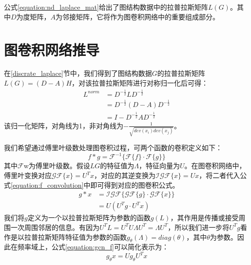 公式\ref{equation:nd_laplace_mat}给出了图结构数据中的拉普拉斯矩阵$L(G)$。其中$D$为度矩阵，$A$为邻接矩阵，它将作为图卷积网络中的重要组成部分。

\section{图卷积网络推导}
在\ref{discrate_laplace}节中，我们得到了图结构数据$G$的拉普拉斯矩阵$L(G) = (D-A)H$，对该拉普拉斯矩阵进行对称归一化后可得：
\begin{equation}
    \begin{aligned}
        L^{norm} &= D^{-\frac{1}{2}}L D^{-\frac{1}{2}} \\
        &= D^{-\frac{1}{2}}(D-A)D^{-\frac{1}{2}} \\
        &= I - D^{-\frac{1}{2}}A D^{-\frac{1}{2}}
    \end{aligned}
    \label{equation:norm_laplace}
\end{equation}
该归一化矩阵，对角线为1，非对角线为$-\frac{1}{\sqrt{dev(x_i)dev(x_j)} }$。

我们希望通过傅里叶级数处理图卷积过程，可两个函数的卷积定义如下：
\begin{equation}
    f*g = \mathcal{F}^{-1}\{\mathcal{F}\{f\} \cdot \mathcal{F} \{ g \} \}
    \label{equation:f_convolution}
\end{equation}
其中$\mathcal{F}$w为傅里叶级数。假设$L{G}$的特征值为$\Lambda$，特征向量为$U$。在图卷积网络中，傅里叶变换对应$\mathcal{G}\mathcal{F}\{x\} = U^Tx$，对应的其逆变换为$\mathcal{I}\mathcal{G}\mathcal{F}\{x\} = Ux$，将二者代入公式\ref{equation:f_convolution}中即可得到对应的图卷积公式。
\begin{equation}
    \begin{aligned}
        g * x &= \mathcal{I}\mathcal{G}\mathcal{F}\{ \mathcal{G}\mathcal{F}\{g\} \cdot \mathcal{G}\mathcal{F}\{x\} \} \\
        &=U(U^Tg \cdot U^Tx) 
    \end{aligned}
    \label{equation:gcn_f}
\end{equation}
我们将$g$定义为一个以拉普拉斯矩阵为参数的函数$g(L)$，其作用是传播或接受周围一次周围邻居的信息。有因为$U^T L = U^T U \Lambda U^T = \Lambda U^T$，所以我们进一步将$U^T g$看作是以拉普拉斯矩阵特征值为参数的函数$g_\theta(\Lambda) = diag(\theta)$，其中$\theta$为参数。因此在频率域上，公式\ref{equation:gcn_f}可以简化表示为：
\begin{equation}
    g_\theta x= Ug_\theta U^T x
    \label{equation:gcn_f_2}
\end{equation}

